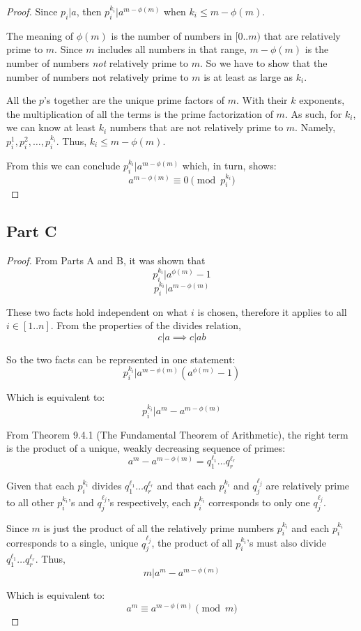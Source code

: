 \documentclass{article}
\begin{document}
\begin{proof}
  Since $p_i \vert a$, then $p_i^{k_i} \vert a^{m - \phi(m)}$ when $k_i \leq m -
  \phi(m)$.

  \bigbreak

  The meaning of $\phi(m)$ is the number of numbers in $[0..m)$ that are
  relatively prime to $m$. Since $m$ includes all numbers in that range, $m -
  \phi(m)$ is the number of numbers \textit{not} relatively prime to $m$. So we
  have to show that the number of numbers not relatively prime to $m$ is at
  least as large as $k_i$.

  \bigbreak

  All the $p$'s together are the unique prime factors of $m$. With their $k$
  exponents, the multiplication of all the terms is the prime factorization of
  $m$. As such, for $k_i$, we can know at least $k_i$ numbers that are not
  relatively prime to $m$. Namely, $p_i^{1}, p_i^{2}, \ldots, p_i^{k_i}$.  Thus,
  $k_i \leq m - \phi(m)$.

  \bigbreak

  From this we can conclude $p_i^{k_i} \vert a^{m - \phi(m)}$ which, in turn,
  shows: 
  $$ a^{m - \phi(m)} \equiv 0 \pmod{p_i^{k_i}} $$
\end{proof}

\break

\subsection*{Part C}

\begin{proof}
  From Parts A and B, it was shown that 
  $$ p_i^{k_i} \vert a^{\phi(m)} - 1 $$ 
  $$ p_i^{k_i} \vert a^{m - \phi(m)} $$

  These two facts hold independent on what $i$ is chosen, therefore it applies
  to all $i \in [1..n]$. From the properties of the divides relation, 
  $$ c \vert a \implies c \vert ab $$

  So the two facts can be represented in one statement: 
  $$ p_i^{k_i} \vert a^{m - \phi(m)} \left(a^{\phi(m)} - 1\right) $$

  Which is equivalent to: 
  $$ p_i^{k_i} \vert a^m - a^{m - \phi(m)} $$

  From Theorem 9.4.1 (The Fundamental Theorem of Arithmetic), the right term is
  the product of a unique, weakly decreasing sequence of primes: 
  $$ a^m - a^{m - \phi(m)} = q_1^{\ell_1} \ldots q_r^{\ell_r} $$

  Given that each $p_i^{k_i}$ divides $q_1^{\ell_1} \ldots q_r^{\ell_r}$ and
  that each $p_i^{k_i}$ and $q_j^{\ell_j}$ are relatively prime to all other
  $p_i^{k_i}$'s and $q_j^{\ell_j}$'s respectively, each $p_i^{k_i}$ corresponds
  to only one $q_j^{\ell_j}$.

  \bigbreak

  Since $m$ is just the product of all the relatively prime numbers $p_i^{k_i}$
  and each $p_i^{k_i}$ corresponds to a single, unique $q_j^{\ell_j}$, the
  product of all $p_i^{k_i}$'s must also divide $q_1^{\ell_1} \ldots
  q_r^{\ell_r}$. Thus, 
  $$ m \vert  a^m - a^{m - \phi(m)} $$

  Which is equivalent to: 
  $$ a^{m} \equiv a^{m - \phi(m)} \pmod{m} $$
\end{proof}
\end{document}
